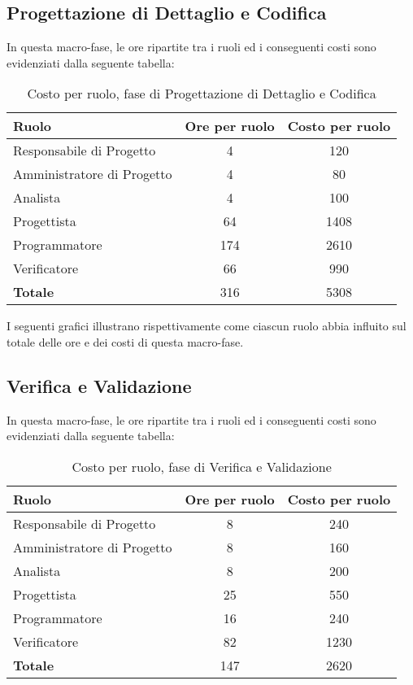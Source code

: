 \subsection{Progettazione di Dettaglio e Codifica}
In questa macro-fase, le ore ripartite tra i ruoli ed i conseguenti costi sono evidenziati dalla seguente tabella:

\begin{table}[h]
	\centering
	\begin{tabular}{|l|c|c|}
		\toprule
		\textbf{Ruolo} & \textbf{Ore per ruolo} & \textbf{Costo per ruolo} \\
		
		\midrule
		Responsabile di Progetto & 4 & 120 \\
		Amministratore di Progetto & 4 & 80 \\ 
		Analista & 4 & 100 \\
		Progettista & 64 & 1408 \\
		Programmatore & 174 & 2610 \\
		Verificatore & 66 & 990 \\
		\midrule
		\textbf{Totale} & 316 & 5308 \\
		
		\bottomrule
	\end{tabular}
	\caption{Costo per ruolo, fase di Progettazione di Dettaglio e Codifica}
\end{table}

I seguenti grafici illustrano rispettivamente come ciascun ruolo abbia influito sul totale delle ore e dei costi di questa macro-fase.

\subsection{Verifica e Validazione}
In questa macro-fase, le ore ripartite tra i ruoli ed i conseguenti costi sono evidenziati dalla seguente tabella:

\begin{table}[h]
	\centering
	\begin{tabular}{|l|c|c|}
		\toprule
		\textbf{Ruolo} & \textbf{Ore per ruolo} & \textbf{Costo per ruolo} \\
		
		\midrule
		Responsabile di Progetto & 8 & 240 \\
		Amministratore di Progetto & 8 & 160 \\ 
		Analista & 8 & 200 \\
		Progettista & 25 & 550 \\
		Programmatore & 16 & 240 \\
		Verificatore & 82 & 1230 \\
		\midrule
		\textbf{Totale} & 147 & 2620 \\
		
		\bottomrule
	\end{tabular}
	\caption{Costo per ruolo, fase di Verifica e Validazione}
\end{table}

